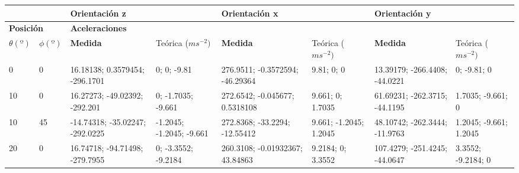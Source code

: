 \documentclass[spanish,12pt,a4paper,titlepage]{report}
\begin{document}
\begin{table}[H]
\centering
\begin{tiny}
\begin{tabular}{p{30pt}p{30pt}|p{40pt}|p{26pt}|p{40pt}|p{26pt}|p{40pt}|p{26pt}|}
\hhline{~~------}
&

& \multicolumn{2}{|p{79pt}|}{\cellcolor[gray]{0.5} \centering \textbf{Orientación z}}  
& \multicolumn{2}{|p{79.5pt}|}{\cellcolor[gray]{0.5} \centering \textbf{Orientación x}}
& \multicolumn{2}{|p{78.7pt}|}{\cellcolor[gray]{0.5} \centering \textbf{Orientación y}} \\ \hline 

  \multicolumn{2}{|p{72.5pt}|}{\cellcolor[gray]{0.6}  \centering\textbf{Posición}}  
& \multicolumn{6}{|p{262.8pt}|}{\cellcolor[gray]{0.6} \centering\textbf{Aceleraciones}}  \\ \hline
  \multicolumn{1}{|p{30pt}|}{\cellcolor[gray]{0.7} $\theta(º)$}
& \multicolumn{1}{|p{30pt}|}{\cellcolor[gray]{0.7} $\phi(º)$} 
& \multicolumn{1}{|p{40pt}|}{\cellcolor[gray]{0.8} \textbf{Medida}}  
& \multicolumn{1}{|p{26.2pt}|}{\cellcolor[gray]{0.7} Teórica ($ms^{-2})$ }
& \multicolumn{1}{|p{40pt}|}{\cellcolor[gray]{0.8} \textbf{Medida}}  
& \multicolumn{1}{|p{26.7pt}|}{\cellcolor[gray]{0.7} Teórica ($ms^{-2})$ }
& \multicolumn{1}{|p{40pt}|}{\cellcolor[gray]{0.8} \textbf{Medida}}  
& \multicolumn{1}{|p{26pt}|}{\cellcolor[gray]{0.7} Teórica ($ms^{-2})$ }
\\ \hline
\multicolumn{1}{|p{30pt}|}{0}  & 0  &  16.18138;    0.3579454;    -296.1701 &       0;          0;      -9.81 & 276.9511;      -0.3572594;    -46.29364 &   9.81;          0;         0 & 13.39179;    -266.4408;    -44.0221 &      0;      -9.81;         0\\ \hline
\multicolumn{1}{|p{30pt}|}{10} & 0  &  16.27273;    -49.02392;     -292.201 &       0;    -1.7035;     -9.661 & 272.6542;       -0.045677;    0.5318108 &  9.661;          0;    1.7035 & 61.69231;    -262.3715;    -44.1195 & 1.7035;     -9.661;         0\\ \hline
\multicolumn{1}{|p{30pt}|}{10} & 45 & -14.74318;    -35.02247;    -292.0225 & -1.2045;    -1.2045;     -9.661 & 272.8368;        -33.2294;    -12.55412 &  9.661;    -1.2045;    1.2045 & 48.10742;    -262.3444;    -11.9763 & 1.2045;     -9.661;    1.2045\\ \hline
\multicolumn{1}{|p{30pt}|}{20} & 0  &  16.74718;    -94.71498;    -279.7955 &       0;    -3.3552;    -9.2184 & 260.3108;     -0.01932367;     43.84863 & 9.2184;          0;    3.3552 & 107.4279;    -251.4245;    -44.0647 & 3.3552;    -9.2184;         0\\ \hline

\end{tabular}
\end{tiny}
\end{table}
\end{document}
